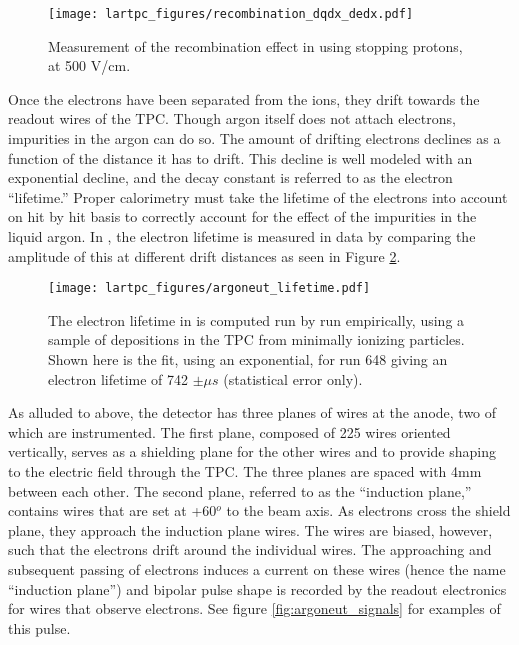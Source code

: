 \begin{figure}[h]
  \centering
  \texttt{[image: lartpc\_figures/recombination\_dqdx\_dedx.pdf]}
  \caption{Measurement of the recombination effect in \argoneut using stopping protons, at 500 V/cm.}
  \label{fig:argoneut_recombination}
\end{figure}

Once the electrons have been separated from the ions, they drift towards the readout wires of the TPC.  Though argon itself does not attach electrons, impurities in the argon can do so.  The amount of drifting electrons declines as a function of the distance it has to drift.  This decline is well modeled with an exponential decline, and the decay constant is referred to as the electron ``lifetime.'' Proper calorimetry must take the lifetime of the electrons into account on hit by hit basis to correctly account for the effect of the impurities in the liquid argon.  In \argoneut, the electron lifetime is measured in data by comparing the amplitude of this at different drift distances as seen in Figure \ref{fig:argoneut_lifetime}.

\begin{figure}[h]
  \centering
  \texttt{[image: lartpc\_figures/argoneut\_lifetime.pdf]}
  \caption{The electron lifetime in \argoneut is computed run by run empirically, using a sample of depositions in the TPC from minimally ionizing particles.  Shown here is the fit, using an exponential, for run 648 giving an electron lifetime of 742 $\pm \mu s$ (statistical error only).}
  \label{fig:argoneut_lifetime}
\end{figure}


As alluded to above, the \argoneut detector has three planes of wires at the anode, two of which are instrumented.  The first plane, composed of 225 wires oriented vertically, serves as a shielding plane for the other wires and to provide shaping to the electric field through the TPC.  The three planes are spaced with 4mm between each other.  The second plane, referred to as the ``induction plane,'' contains wires that are set at +60$^o$ to the beam axis.  As electrons cross the shield plane, they approach the induction plane wires.  The wires are biased, however, such that the electrons drift around the individual wires.  The approaching and subsequent passing of electrons induces a current on these wires (hence the name ``induction plane'') and bipolar pulse shape is recorded by the readout electronics for wires that observe electrons.  See figure \ref{fig:argoneut_signals} for examples of this pulse.

